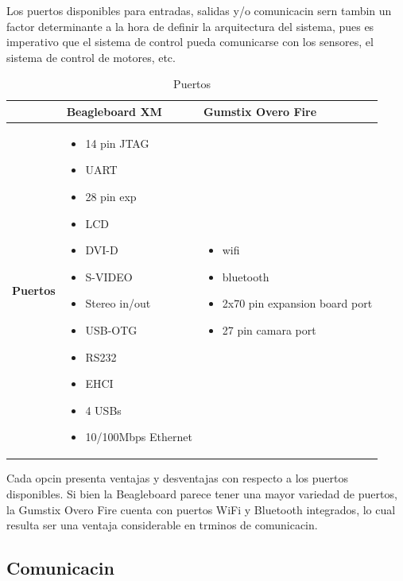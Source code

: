 \documentclass[spanish,12pt,a4paper,titlepage]{report}
\begin{document}
Los puertos disponibles para entradas, salidas y/o comunicacin sern tambin un factor determinante a la hora de definir la arquitectura del sistema, pues es imperativo que el sistema de control pueda comunicarse con los sensores, el sistema de control de motores, etc.

\begin{table}[H]
\begin{tabular}{p{130pt}|p{130pt}|p{130pt}|} 
\cline{2-3}
& \cellcolor[gray]{0.8} \textbf{Beagleboard XM} 
& \cellcolor[gray]{0.8} \textbf{Gumstix Overo Fire} \\ \cline{1-3} \hline
\multicolumn{1}{|p{130pt}|}{\cellcolor[gray]{0.8}\textbf{Puertos}} 
&\begin{itemize}
\item 14 pin JTAG
\item UART
\item 28 pin exp
\item LCD
\item DVI-D
\item S-VIDEO
\item Stereo in/out
\item USB-OTG
\item RS232
\item EHCI
\item 4 USBs
\item 10/100Mbps Ethernet
\end{itemize}
&\begin{itemize}
\item wifi
\item bluetooth
\item 2x70 pin expansion board port
\item 27 pin camara port
\end{itemize}\\
\hline
\end{tabular}
\caption{Puertos}
\label{tab:puertos}
\end{table}

Cada opcin presenta ventajas y desventajas con respecto a los puertos disponibles. Si bien la Beagleboard parece tener una mayor variedad de puertos, la Gumstix Overo Fire cuenta con puertos WiFi y Bluetooth integrados, lo cual resulta ser una ventaja considerable en trminos de comunicacin.

\subsection*{Comunicacin}
\end{document}
